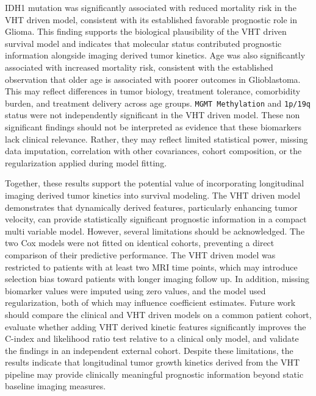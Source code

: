 IDH1 mutation was significantly associated with reduced mortality risk in the VHT driven model, consistent with its established favorable prognostic role in Glioma. This finding supports the biological plausibility of the VHT driven survival model and indicates that molecular status contributed prognostic information alongside imaging derived tumor kinetics. Age was also significantly associated with increased mortality risk, consistent with the established observation that older age is associated with poorer outcomes in Glioblastoma. This may reflect differences in tumor biology, treatment tolerance, comorbidity burden, and treatment delivery across age groups. \texttt{MGMT Methylation} and \texttt{1p/19q }status were not independently significant in the VHT driven model. These non significant findings should not be interpreted as evidence that these biomarkers lack clinical relevance. Rather, they may reflect limited statistical power, missing data imputation, correlation with other covariances, cohort composition, or the regularization applied during model fitting.

Together, these results support the potential value of incorporating longitudinal imaging derived tumor kinetics into survival modeling. The VHT driven model demonstrates that dynamically derived features, particularly enhancing tumor velocity, can provide statistically significant prognostic information in a compact multi variable model. However, several limitations should be acknowledged. The two Cox models were not fitted on identical cohorts, preventing a direct comparison of their predictive performance. The VHT driven model was restricted to patients with at least two MRI time points, which may introduce selection bias toward patients with longer imaging follow up. In addition, missing biomarker values were imputed using zero values, and the model used regularization, both of which may influence coefficient estimates. Future work should compare the clinical and VHT driven models on a common patient cohort, evaluate whether adding VHT derived kinetic features significantly improves the C-index and likelihood ratio test relative to a clinical only model, and validate the findings in an independent external cohort. Despite these limitations, the results indicate that longitudinal tumor growth kinetics derived from the VHT pipeline may provide clinically meaningful prognostic information beyond static baseline imaging measures.

